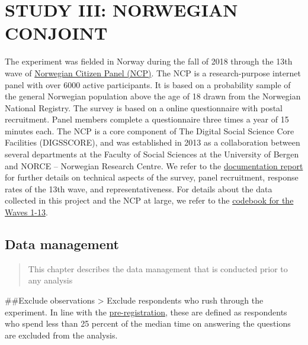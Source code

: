\documentclass[
]{book}
\begin{document}
\hypertarget{part-study-iii-norwegian-conjoint}{%
\part{STUDY III: NORWEGIAN CONJOINT}\label{part-study-iii-norwegian-conjoint}}

The experiment was fielded in Norway during the fall of 2018 through the 13th wave of \href{https://www.uib.no/medborger}{Norwegian Citizen Panel (NCP)}. The NCP is a research-purpose internet panel with over 6000 active participants. It is based on a probability sample of the general Norwegian population above the age of 18 drawn from the Norwegian National Registry. The survey is based on a online questionnaire with postal recruitment. Panel members complete a questionnaire three times a year of 15 minutes each. The NCP is a core component of The Digital Social Science Core Facilities (DIGSSCORE), and was established in 2013 as a collaboration between several departments at the Faculty of Social Sciences at the University of Bergen and NORCE -- Norwegian Research Centre. We refer to the \href{Data/ncp-wave13-documentation.pdf}{documentation report} for further details on technical aspects of the survey, panel recruitment, response rates of the 13th wave, and representativeness. For details about the data collected in this project and the NCP at large, we refer to the \href{Data/ncp-wave13-codebook.pdf}{codebook for the Waves 1-13}.

\hypertarget{data-management-2}{%
\chapter{Data management}\label{data-management-2}}

\begin{quote}
This chapter describes the data management that is conducted prior to any analysis
\end{quote}

\#\#Exclude observations
\textgreater{} Exclude respondents who rush through the experiment. In line with the \href{GoogLoser_Prereg_3_\#16823}{pre-registration}, these are defined as respondents who spend less than 25 percent of the median time on answering the questions are excluded from the analysis.
\end{document}
